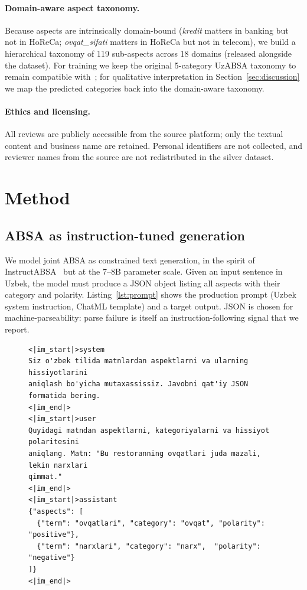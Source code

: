 \documentclass[runningheads]{llncs}
\begin{document}
\paragraph{Domain-aware aspect taxonomy.} Because aspects are intrinsically
domain-bound (\textit{kredit} matters in banking but not in HoReCa;
\textit{ovqat\_sifati} matters in HoReCa but not in telecom), we build a
hierarchical taxonomy of 119 sub-aspects across 18 domains (released
alongside the dataset). For training we keep the original 5-category UzABSA
taxonomy to remain compatible with~\cite{matlatipov2024uzabsa}; for
qualitative interpretation in Section~\ref{sec:discussion} we map the
predicted categories back into the domain-aware taxonomy.

\paragraph{Ethics and licensing.} All reviews are publicly accessible from
the source platform; only the textual content and business name are
retained. Personal identifiers are not collected, and reviewer names from
the source are not redistributed in the silver dataset.

\section{Method}
\label{sec:method}

\subsection{ABSA as instruction-tuned generation}
\label{sec:method:formulation}

We model joint ABSA as constrained text generation, in the spirit of
InstructABSA~\cite{scaria-etal-2024-instructabsa} but at the 7--8B
parameter scale. Given an input sentence in Uzbek, the model must produce
a JSON object listing all aspects with their category and polarity.
Listing~\ref{lst:prompt} shows the production prompt (Uzbek system
instruction, ChatML template) and a target output. JSON is chosen for
machine-parseability: parse failure is itself an instruction-following
signal that we report.

\begin{figure}[!htbp]
\begin{lstlisting}[caption={Production prompt (abridged) and target
output. The system message is in Uzbek; the assistant message is a
strict JSON object.},label={lst:prompt}]
<|im_start|>system
Siz o'zbek tilida matnlardan aspektlarni va ularning hissiyotlarini
aniqlash bo'yicha mutaxassissiz. Javobni qat'iy JSON formatida bering.
<|im_end|>
<|im_start|>user
Quyidagi matndan aspektlarni, kategoriyalarni va hissiyot polaritesini
aniqlang. Matn: "Bu restoranning ovqatlari juda mazali, lekin narxlari
qimmat."
<|im_end|>
<|im_start|>assistant
{"aspects": [
  {"term": "ovqatlari", "category": "ovqat", "polarity": "positive"},
  {"term": "narxlari", "category": "narx",  "polarity": "negative"}
]}
<|im_end|>
\end{lstlisting}
\end{figure}
\end{document}
